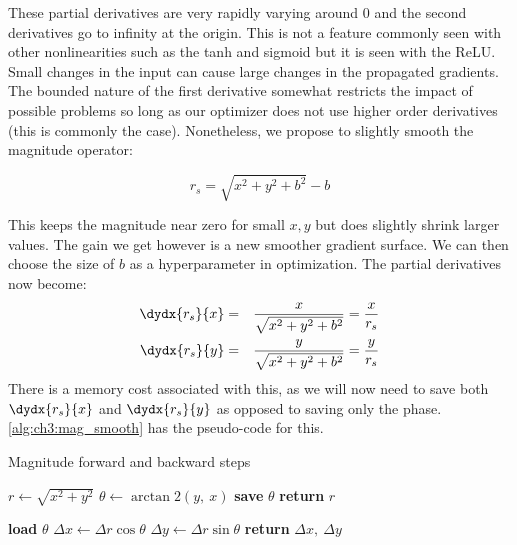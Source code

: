 These partial derivatives are very rapidly varying around 0 and the second
derivatives go to infinity at the origin. This is not a
feature commonly seen with other nonlinearities such as the tanh and sigmoid
but it is seen with the ReLU. Small changes in the input can cause large changes
in the propagated gradients.
The bounded nature of the first derivative somewhat restricts the impact of
possible problems so
long as our optimizer does not use higher order derivatives (this is commonly
the case). Nonetheless, we propose to slightly smooth the magnitude operator:

\begin{equation}\label{eq:ch3:magbias}
 r_s = \sqrt{x^2 + y^2 + b^2} - b
\end{equation}

This keeps the magnitude near zero for small $x,y$ but does slightly shrink larger
values. The gain we get however is a new smoother gradient surface.
We can then choose the size of $b$ as a hyperparameter in
optimization. The partial derivatives now become:
\begin{eqnarray}
  \dydx{r_s}{x} & = & \frac{x}{\sqrt{x^2 + y^2+b^2}} = \frac{x}{r_s}\\
  \dydx{r_s}{y} & = & \frac{y}{\sqrt{x^2 + y^2+b^2}} = \frac{y}{r_s} 
\end{eqnarray}
There is a memory cost associated with this, as we will now need to save both
$\dydx{r_s}{x}$ and $\dydx{r_s}{y}$ as opposed to saving only the phase.
\autoref{alg:ch3:mag_smooth} has the pseudo-code for this.

\begin{algorithm}[tb]
\caption{Magnitude forward and backward steps}\label{alg:ch3:mag}
\begin{algorithmic}[1]
  \State $r \gets \sqrt{x^2 + y^2}$
  \State $\theta \gets \arctan2(y,\ x)$ 
  \State \textbf{save} $\theta$ 
  \State \textbf{return} $r$
\EndFunction
\end{algorithmic}\vspace{10pt}
\begin{algorithmic}[1]
  \State \textbf{load} $\theta$
  \State $\Delta x \gets \Delta r \cos{\theta}$ 
  \State $\Delta y \gets \Delta r \sin{\theta}$ 
  \State \textbf{return} $\Delta x,\ \Delta y$
\EndFunction
\end{algorithmic}
\end{algorithm}

